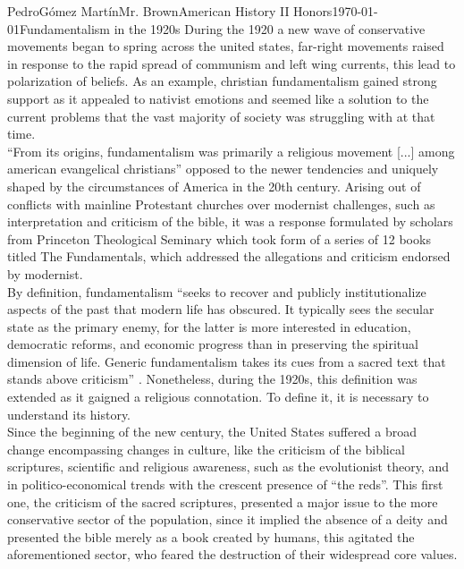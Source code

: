 \documentclass[12pt, letterpaper]{article}
\begin{document}
\begin{mla}{Pedro}{G\'{o}mez Mart\'{i}n}{Mr. Brown}{American History II Honors}{\today}{Fundamentalism in the 1920s}
  During the 1920 a new wave of conservative movements began to spring across the united states, far-right movements raised in response to the rapid spread of communism and left wing currents, this lead to polarization of beliefs. As an example, christian fundamentalism gained strong support as it appealed to nativist emotions and seemed like a solution to the current problems that the vast majority of society was struggling with at that time.\\
  “From its origins, fundamentalism was primarily a religious movement [...] among american evangelical christians”\parencite{fundamentalism1} opposed to the newer tendencies and uniquely shaped by the circumstances of America in the 20th century. Arising out of conflicts with mainline Protestant churches over modernist challenges, such as interpretation and criticism of the bible, it was a response formulated by scholars from Princeton Theological Seminary which took form of a series of 12 books titled The Fundamentals, which addressed the allegations and criticism endorsed by modernist.\parencite{ChristianFundamentalism}\\ 
  By definition, fundamentalism “seeks to recover and publicly institutionalize aspects of the past that modern life has obscured. It typically sees the secular state as the primary enemy, for the latter is more interested in education, democratic reforms, and economic progress than in preserving the spiritual dimension of life. Generic fundamentalism takes its cues from a sacred text that stands above criticism” \parencite{RiseFundamentalism}. Nonetheless, during the 1920s, this definition was extended as it gaigned a religious connotation. To define it, it is necessary to understand its history.\\
  Since the beginning of the new century, the United States suffered a broad change encompassing changes in culture, like the criticism of the biblical scriptures, scientific and religious awareness, such as the evolutionist theory, and in politico-economical trends with the crescent presence of “the reds”. This first one, the criticism of the sacred scriptures, presented a major issue to the more conservative sector of the population, since it implied the absence of a deity and presented the bible merely as a book created by humans, this agitated the aforementioned sector, who feared the destruction of their widespread core values.\\

\end{mla}
\end{document}
